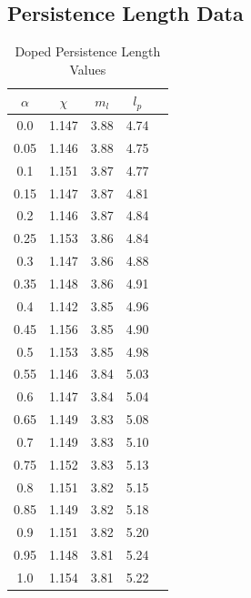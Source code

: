\subsection{Persistence Length Data}
\begin{table}[hbt!]\centering
\caption{Doped Persistence Length Values}
\label{tab:d_lp}
\renewcommand{\arraystretch}{1.5}
\begin{threeparttable}
\begin{tabular}{ccccc}\toprule
\multicolumn{1}{c}{\multirow{1}{3.5cm}{\centering $\alpha$}} &
\multicolumn{1}{c}{\multirow{1}{1.5cm}{\centering $\chi$}} &
\multicolumn{1}{c}{\multirow{1}{1.5cm}{\centering $m_l$}} &
\multicolumn{1}{c}{\multirow{1}{1.5cm}{\centering $l_p$}} & \\ \midrule
    0.0 & 1.147 & 3.88 & 4.74\\
    0.05 & 1.146 & 3.88 & 4.75\\
    0.1 & 1.151 & 3.87 & 4.77\\
    0.15 & 1.147 & 3.87 & 4.81\\
    0.2 & 1.146 & 3.87 & 4.84\\
    0.25 & 1.153 & 3.86 & 4.84\\
    0.3 & 1.147 & 3.86 & 4.88\\ \midrule
    0.35 & 1.148 & 3.86 & 4.91\\
    0.4 & 1.142 & 3.85 & 4.96\\
    0.45 & 1.156 & 3.85 & 4.90\\
    0.5 & 1.153 & 3.85 & 4.98\\
    0.55 & 1.146 & 3.84 & 5.03\\
    0.6 & 1.147 & 3.84 & 5.04\\
    0.65 & 1.149 & 3.83 & 5.08\\ \midrule
    0.7 & 1.149 & 3.83 & 5.10\\
    0.75 & 1.152 & 3.83 & 5.13\\
    0.8 & 1.151 & 3.82 & 5.15\\
    0.85 & 1.149 & 3.82 & 5.18\\
    0.9 & 1.151 & 3.82 & 5.20\\
    0.95 & 1.148 & 3.81 & 5.24\\
    1.0 & 1.154 & 3.81 & 5.22\\ \bottomrule
\end{tabular}
\begin{tablenotes}
\item
\end{tablenotes}
\end{threeparttable}
\end{table}

